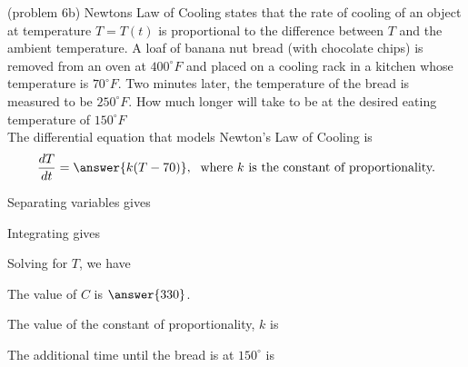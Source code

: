 \documentclass{ximera}
\begin{document}
\begin{problem}(problem 6b)
Newtons Law of Cooling states that the rate of cooling of an object at temperature $T = T(t)$ is proportional to the difference between $T$
and the ambient temperature. A loaf of banana nut bread (with chocolate chips) is removed from an oven at $400^\circ F$ and placed on a cooling rack
in a kitchen whose temperature is $70^{\circ} F$.  
Two minutes later, the temperature of the bread is measured to be $250^\circ F$.
How much longer will take to be at the desired eating temperature of $150^\circ F$ \\

The differential equation that models Newton's Law of Cooling is
\[
\frac{dT}{dt} = \answer{k(T-70)}, \; \text{ where $k$ is the constant of proportionality.}
\]

Separating variables gives

\begin{multipleChoice}
\end{multipleChoice}


Integrating gives
\begin{multipleChoice}
\end{multipleChoice}


Solving for $T$, we have

\begin{multipleChoice}
\end{multipleChoice}

The value of $C$ is $\answer{330}$.

The value of the constant of proportionality, $k$ is

\begin{multipleChoice}
\end{multipleChoice}



The additional time until the bread is at $150^\circ$ is 

\begin{multipleChoice}
\end{multipleChoice}


\end{problem}
\end{document}
